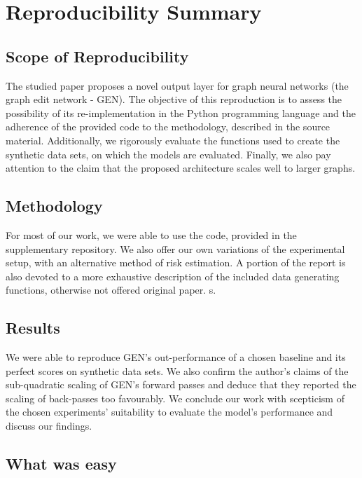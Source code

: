\section*{Reproducibility Summary}

\subsection*{Scope of Reproducibility}

The studied paper proposes a novel output layer for graph neural networks (the graph edit network - GEN). The objective of this reproduction is to assess the possibility of its re-implementation in the Python programming language and the adherence of the provided code to the methodology, described in the source material. Additionally, we rigorously evaluate the functions used to create the synthetic data sets, on which the models are evaluated. Finally, we also pay attention to the claim that the proposed architecture scales well to larger graphs.  


\subsection*{Methodology}


For most of our work, we were able to use the code, provided in the supplementary repository. We also offer our own variations of the experimental setup, with an alternative method of risk estimation. A portion of the report is also devoted to a more exhaustive description of the included data generating functions, otherwise not offered original paper.
s. 

\subsection*{Results}

We were able to reproduce GEN's out-performance of a chosen baseline and its perfect scores on synthetic data sets. We also confirm the author's claims of the sub-quadratic scaling of GEN's forward passes and deduce that they reported the scaling of back-passes too favourably. We conclude our work with scepticism of the chosen experiments' suitability to evaluate the model's performance and discuss our findings.


\subsection*{What was easy}



